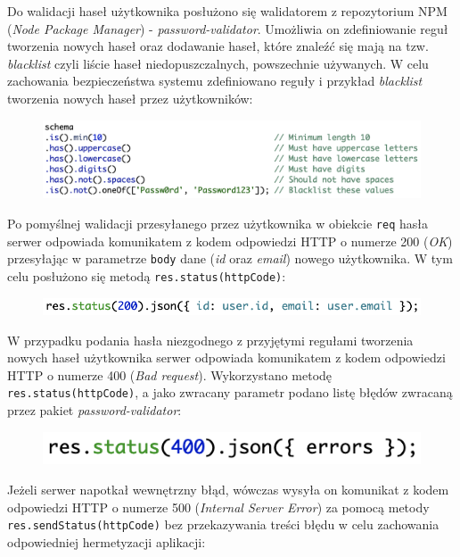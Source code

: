 Do walidacji haseł użytkownika posłużono się walidatorem z repozytorium NPM (\textit{Node Package Manager}) - \textit{password-validator}. Umożliwia on zdefiniowanie reguł tworzenia nowych haseł oraz dodawanie haseł, które znaleźć się mają na tzw. \textit{blacklist} czyli liście haseł niedopuszczalnych, powszechnie używanych. W celu zachowania bezpieczeństwa systemu zdefiniowano reguły i przykład \textit{blacklist} tworzenia nowych haseł przez użytkowników:

\begin{figure}[h]
	\includegraphics[scale=0.7]{images/code/passwords_schema.png}
\end{figure}

Po pomyślnej walidacji przesyłanego przez użytkownika w obiekcie \texttt{req} hasła serwer odpowiada komunikatem z kodem odpowiedzi HTTP o numerze 200 (\textit{OK}) przesyłając w parametrze \texttt{body} dane (\textit{id} oraz \textit{email}) nowego użytkownika. W tym celu posłużono się metodą \texttt{res.status(httpCode)}:

\begin{figure}[h]
	\includegraphics[scale=0.7]{images/code/res_status_200.png}
\end{figure}

W przypadku podania hasła niezgodnego z przyjętymi regułami tworzenia nowych haseł użytkownika serwer odpowiada komunikatem z kodem odpowiedzi HTTP o numerze 400 (\textit{Bad request}). Wykorzystano metodę \texttt{res.status(httpCode)}, a jako zwracany parametr podano listę błędów zwracaną przez pakiet \textit{password-validator}:

\begin{figure}[h]
	\includegraphics[scale=0.7]{images/code/res_status_400.png}
\end{figure}

Jeżeli serwer napotkał wewnętrzny błąd, wówczas wysyła on komunikat z kodem odpowiedzi HTTP o numerze 500 (\textit{Internal Server Error}) za pomocą metody \texttt{res.sendStatus(httpCode)} bez przekazywania treści błędu w celu zachowania odpowiedniej hermetyzacji aplikacji:

